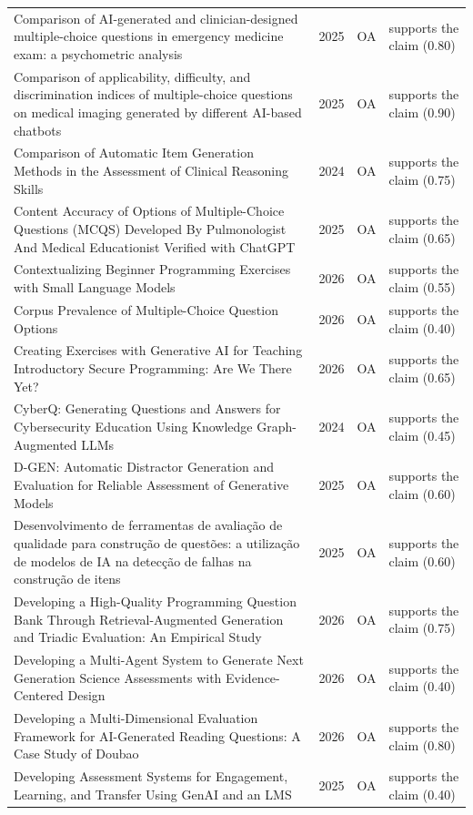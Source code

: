 \begin{longtable}{@{}%
  >{\raggedright\arraybackslash}p{}c%
  >{\raggedright\arraybackslash}p{}%
  >{\raggedright\arraybackslash}p{}@{}}
Comparison of AI-generated and clinician-designed multiple-choice questions in emergency medicine exam: a psychometric analysis & 2025 & OA & supports the claim (0.80) \\
Comparison of applicability, difficulty, and discrimination indices of multiple-choice questions on medical imaging generated by different AI-based chatbots & 2025 & OA & supports the claim (0.90) \\
Comparison of Automatic Item Generation Methods in the Assessment of Clinical Reasoning Skills & 2024 & OA & supports the claim (0.75) \\
Content Accuracy of Options of Multiple-Choice Questions (MCQS) Developed By Pulmonologist And Medical Educationist Verified with ChatGPT & 2025 & OA & supports the claim (0.65) \\
Contextualizing Beginner Programming Exercises with Small Language Models & 2026 & OA & supports the claim (0.55) \\
Corpus Prevalence of Multiple-Choice Question Options & 2026 & OA & supports the claim (0.40) \\
Creating Exercises with Generative AI for Teaching Introductory Secure Programming: Are We There Yet? & 2026 & OA & supports the claim (0.65) \\
CyberQ: Generating Questions and Answers for Cybersecurity Education Using Knowledge Graph-Augmented LLMs & 2024 & OA & supports the claim (0.45) \\
D-GEN: Automatic Distractor Generation and Evaluation for Reliable Assessment of Generative Models & 2025 & OA & supports the claim (0.60) \\
Desenvolvimento de ferramentas de avaliação de qualidade para construção de questões: a utilização de modelos de IA na detecção de falhas na construção de itens & 2025 & OA & supports the claim (0.60) \\
Developing a High-Quality Programming Question Bank Through Retrieval-Augmented Generation and Triadic Evaluation: An Empirical Study & 2026 & OA & supports the claim (0.75) \\
Developing a Multi-Agent System to Generate Next Generation Science Assessments with Evidence-Centered Design & 2026 & OA & supports the claim (0.40) \\
Developing a Multi-Dimensional Evaluation Framework for AI-Generated Reading Questions: A Case Study of Doubao & 2026 & OA & supports the claim (0.80) \\
Developing Assessment Systems for Engagement, Learning, and Transfer Using GenAI and an LMS & 2025 & OA & supports the claim (0.40) \\

\end{longtable}
